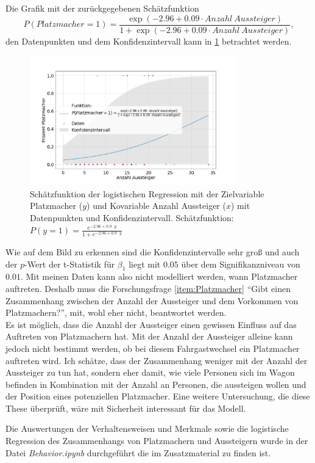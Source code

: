 Die Grafik mit der zurückgegebenen Schätzfunktion $$P(Platzmacher=1) = \frac{\exp(-2.96+0.09 \cdot Anzahl \ Aussteiger)}{1+\exp(-2.96+0.09 \cdot Anzahl \ Aussteiger)},$$
den Datenpunkten und dem Konfidenzintervall kann in \figurename \ref{fig:LogRegPM} betrachtet werden.
\begin{figure}[H]
	\centering
		\includegraphics[width=0.8\textwidth]{pictures/data_evaluation/behavior/log_reg_spacemaker.png}
	\caption{Schätzfunktion der logistischen Regression mit der Zielvariable Platzmacher ($y$) und Kovariable Anzahl Aussteiger ($x$) mit Datenpunkten und Konfidenzintervall. Schätzfunktion: $P(y=1) = \frac{e^{-2.96+0.9 \cdot y}}{1 + e^{-2.96 + 0.9 \cdot y}}$}
	\label{fig:LogRegPM}
\end{figure}
Wie auf dem Bild zu erkennen sind die Konfidenzintervalle sehr groß und auch der $p$-Wert der t-Statistik für $\beta_1$ liegt mit $0.05$ über dem Signifikanzniveau von $0.01$. Mit meinen Daten kann also nicht modelliert werden, wann Platzmacher auftreten. Deshalb muss die Forschungsfrage \ref{item:Platzmacher} "`Gibt einen Zusammenhang zwischen der Anzahl der Aussteiger und dem Vorkommen von Platzmachern?"', mit, wohl eher nicht, beantwortet werden. \\
Es ist möglich, dass die Anzahl der Aussteiger einen gewissen Einfluss auf das Auftreten von Platzmachern hat. Mit der Anzahl der Aussteiger alleine kann jedoch nicht bestimmt werden, ob bei diesem Fahrgastwechsel ein Platzmacher auftreten wird. Ich schätze, dass der Zusammenhang weniger mit der Anzahl der Aussteiger zu tun hat, sondern eher damit, wie viele Personen sich im Wagon befinden in Kombination mit der Anzahl an Personen, die aussteigen wollen und der Position eines potenziellen Platzmacher. Eine weitere Untersuchung, die diese These überprüft, wäre mit Sicherheit interessant für das Modell.

Die Auswertungen der Verhaltensweisen und Merkmale sowie die logistische Regression des Zusammenhangs von Platzmachern und Aussteigern wurde in der Datei \textsl{Behavior.ipynb} durchgeführt die im Zusatzmaterial zu finden ist.

